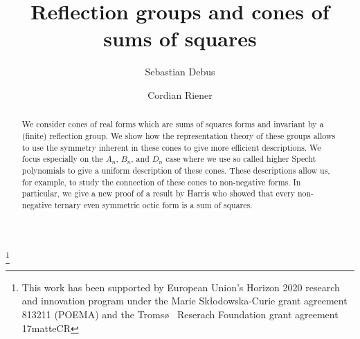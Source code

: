 \documentclass[11pt,a4paper]{amsart}
\numberwithin{equation}{section}
\theoremstyle{definition}
\numberwithin{thm}{section}
\theoremstyle{break}
\numberwithin{subcase}{case}
\begin{document}
\title{Reflection groups and cones of sums of squares}

\author{Sebastian Debus}
\address{Department of Mathematics and Statistics, 
UiT -- The Arctic University of Norway, 9037 Troms\o}


\author{Cordian  Riener}
\address{Department of Mathematics and Statistics, 
UiT -- The Arctic University of Norway, 9037 Troms\o}

\thanks{This work has been supported by European Union's Horizon 2020 research and innovation program under the Marie Sk\l{}odowska-Curie grant agreement 813211 (POEMA) and the Troms\o~ Reserach Foundation grant agreement 17matteCR
 }

\begin{abstract}
We consider cones of real forms which are sums of squares forms and  invariant by a (finite) reflection group. We show how the representation theory of these groups allows to use the symmetry  inherent in these cones to give more efficient descriptions.  We focus especially on the $A_{n}$, $B_n$, and $D_n$ case where we use so called higher Specht polynomials \cite{ariki1997higher} to give a uniform description of these cones. These descriptions allow us, for example,  to study the connection of these cones to non-negative forms. In particular, we give a new proof of a result by Harris \cite{harris1999real} who showed that every non-negative ternary  even symmetric octic form is a sum of squares. 
\end{abstract}
\maketitle
\end{document}
